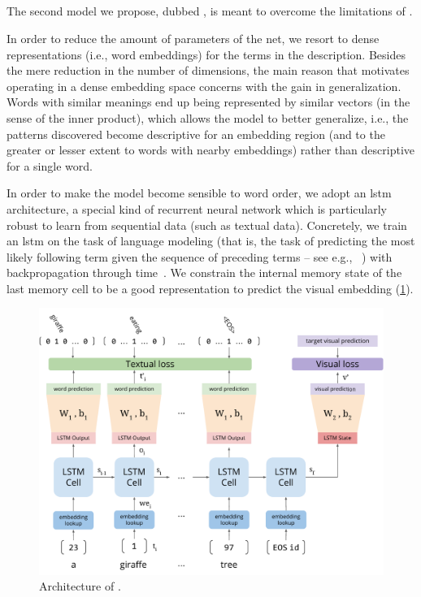 \subsection{\densettv{}}
\label{subsec:t2v:dense-t2v}

The second model we propose, dubbed \densettv{}, is meant to overcome the limitations of \sparsettv{}.

In order to reduce the amount of parameters of the net, we resort to dense representations (i.e.,  word embeddings) for the terms in the description.
Besides the mere reduction in the number of dimensions, the main reason that motivates operating in a dense embedding space concerns with the gain in generalization.
Words with similar meanings end up being represented by similar vectors (in the sense of the inner product), which allows the model to better generalize, i.e.,  the patterns discovered become descriptive for an embedding region (and to the greater or lesser extent to words with nearby embeddings) rather than descriptive for a single word.

In order to make the model become sensible to word order, we adopt an \acrfull{lstm}~\cite{hochreiter1997long} architecture, a special kind of recurrent neural network which is particularly robust to learn from sequential data (such as textual data).
Concretely, we train an \gls{lstm} on the task of language modeling (that is, the task of predicting the most likely following term given the sequence of preceding terms -- see e.g., ~\cite{sundermeyer2012lstm}) with backpropagation through time~\cite{werbos1990backpropagation}.
We constrain the internal memory state of the last memory cell to be a good representation to predict the visual embedding (\ref{fig:t2v:d-t2v-arch}).

\begin{figure}
\includegraphics[width=\linewidth]{d-t2v-arch}
\caption{Architecture of \densettv{}.}
\label{fig:t2v:d-t2v-arch}
\end{figure}

